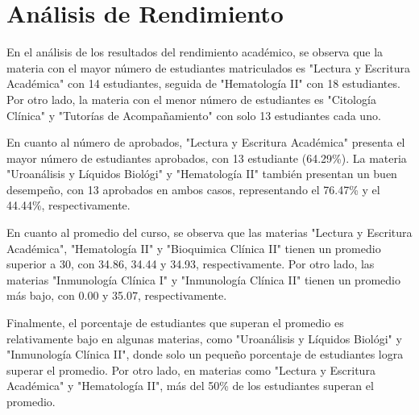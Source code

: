 \vspace{1cm}
\section{Análisis de Rendimiento}
En el análisis de los resultados del rendimiento académico, se observa que la materia con el mayor número de estudiantes matriculados es "Lectura y Escritura Académica" con 14 estudiantes, seguida de "Hematología II" con 18 estudiantes. Por otro lado, la materia con el menor número de estudiantes es "Citología Clínica" y "Tutorías de Acompañamiento" con solo 13 estudiantes cada uno.

En cuanto al número de aprobados, "Lectura y Escritura Académica" presenta el mayor número de estudiantes aprobados, con 13 estudiante (64.29\%). La materia "Uroanálisis y Líquidos Biológi" y "Hematología II" también presentan un buen desempeño, con 13 aprobados en ambos casos, representando el 76.47\% y el 44.44\%, respectivamente.

En cuanto al promedio del curso, se observa que las materias "Lectura y Escritura Académica", "Hematología II" y "Bioquimica Clínica II" tienen un promedio superior a 30, con 34.86, 34.44 y 34.93, respectivamente. Por otro lado, las materias "Inmunología Clínica I" y "Inmunología Clínica II" tienen un promedio más bajo, con 0.00 y 35.07, respectivamente.

Finalmente, el porcentaje de estudiantes que superan el promedio es relativamente bajo en algunas materias, como "Uroanálisis y Líquidos Biológi" y "Inmunología Clínica II", donde solo un pequeño porcentaje de estudiantes logra superar el promedio. Por otro lado, en materias como "Lectura y Escritura Académica" y "Hematología II", más del 50\% de los estudiantes superan el promedio.

